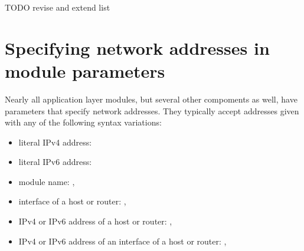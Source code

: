 TODO revise and extend list


\section{Specifying network addresses in module parameters}

Nearly all application layer modules, but several other compoments as well,
have parameters that specify network addresses. They typically accept
addresses given with any of the following syntax variations:

\begin{itemize}
  \item literal IPv4 address: 
  \item literal IPv6 address: 
  \item module name: , 
  \item interface of a host or router: , 
  \item IPv4 or IPv6 address of a host or router: ,
  \item IPv4 or IPv6 address of an interface of a host or router:
      , 
\end{itemize}





